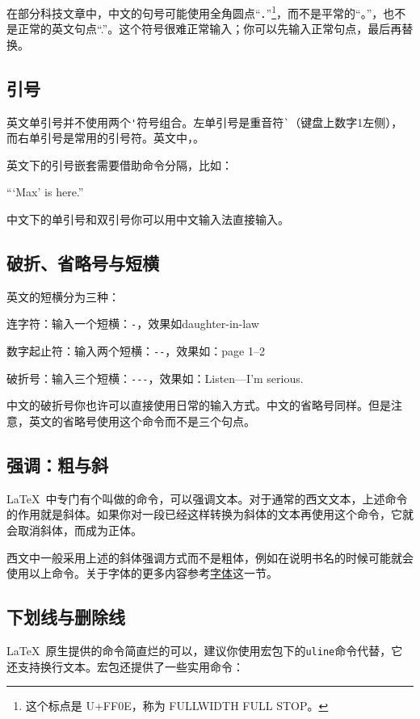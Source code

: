在部分科技文章中，中文的句号可能使用全角圆点“．”\footnote{这个标点是 U+FF0E，称为 FULLWIDTH FULL STOP。}，而不是平常的“。”，也不是正常的英文句点“.”。这个符号很难正常输入；你可以先输入正常句点，最后再替换。

\subsection{引号}
英文单引号并不使用两个\verb|'|符号组合。左单引号是重音符\verb|`|（键盘上数字1左侧），而右单引号是常用的引号符。英文中，。

英文下的引号嵌套需要借助命令分隔，比如：
\begin{codeshow}[listing side text, listing options={escapeinside=++}]
``\thinspace`Max' is here.''
\end{codeshow}
中文下的单引号和双引号你可以用中文输入法直接输入。

\subsection{破折、省略号与短横}
英文的短横分为三种：
\begin{feai}
\item 连字符：输入一个短横：\verb|-|，效果如daughter-in-law
\item 数字起止符：输入两个短横：\verb|--|，效果如：page 1--2
\item 破折号：输入三个短横：\verb|---|，效果如：Listen---I'm serious.
\end{feai}

中文的破折号你也许可以直接使用日常的输入方式。中文的省略号同样。但是注意，英文的省略号使用这个命令而不是三个句点。

\subsection{强调：粗与斜}
\LaTeX\ 中专门有个叫做的命令，可以强调文本。对于通常的西文文本，上述命令的作用就是斜体。如果你对一段已经这样转换为斜体的文本再使用这个命令，它就会取消斜体，而成为正体。

西文中一般采用上述的斜体强调方式而不是粗体，例如在说明书名的时候可能就会使用以上命令。关于字体的更多内容参考\hyperref[sec:font]{字体}这一节。

\subsection{下划线与删除线}
\LaTeX\ 原生提供的命令简直烂的可以，建议你使用宏包下的\texttt{uline}命令代替，它还支持换行文本。宏包还提供了一些实用命令：

